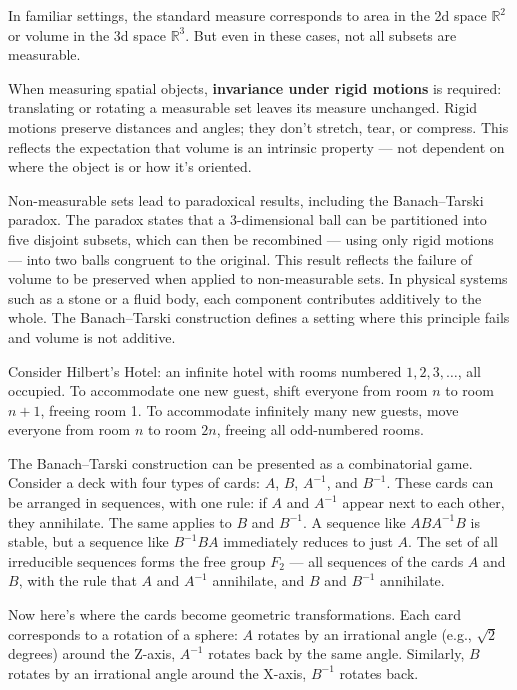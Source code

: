 In familiar settings, the standard measure corresponds to area in the 2d space $\mathbb{R}^2$ or volume in the 3d space $\mathbb{R}^3$. But even in these cases, not all subsets are measurable.

When measuring spatial objects, \textbf{invariance under rigid motions} is required: translating or rotating a measurable set leaves its measure unchanged. Rigid motions preserve distances and angles; they don’t stretch, tear, or compress. This reflects the expectation that volume is an intrinsic property — not dependent on where the object is or how it's oriented.

Non-measurable sets lead to paradoxical results, including the Banach–Tarski paradox. The paradox states that a 3-dimensional ball can be partitioned into five disjoint subsets, which can then be recombined — using only rigid motions — into two balls congruent to the original. This result reflects the failure of volume to be preserved when applied to non-measurable sets. In physical systems such as a stone or a fluid body, each component contributes additively to the whole. The Banach–Tarski construction defines a setting where this principle fails and volume is not additive.

Consider Hilbert's Hotel: an infinite hotel with rooms numbered $1, 2, 3, \ldots$, all occupied. To accommodate one new guest, shift everyone from room $n$ to room $n+1$, freeing room 1. To accommodate infinitely many new guests, move everyone from room $n$ to room $2n$, freeing all odd-numbered rooms.

The Banach–Tarski construction can be presented as a combinatorial game. Consider a deck with four types of cards: $A$, $B$, $A^{-1}$, and $B^{-1}$. These cards can be arranged in sequences, with one rule: if $A$ and $A^{-1}$ appear next to each other, they annihilate. The same applies to $B$ and $B^{-1}$. A sequence like $ABA^{-1}B$ is stable, but a sequence like $B^{-1}BA$ immediately reduces to just $A$. The set of all irreducible sequences forms the free group $F_2$ — all sequences of the cards $A$ and $B$, with the rule that $A$ and $A^{-1}$ annihilate, and $B$ and $B^{-1}$ annihilate.

Now here's where the cards become geometric transformations. Each card corresponds to a rotation of a sphere: $A$ rotates by an irrational angle (e.g., $\sqrt{2}$ degrees) around the Z-axis, $A^{-1}$ rotates back by the same angle. Similarly, $B$ rotates by an irrational angle around the X-axis, $B^{-1}$ rotates back.

